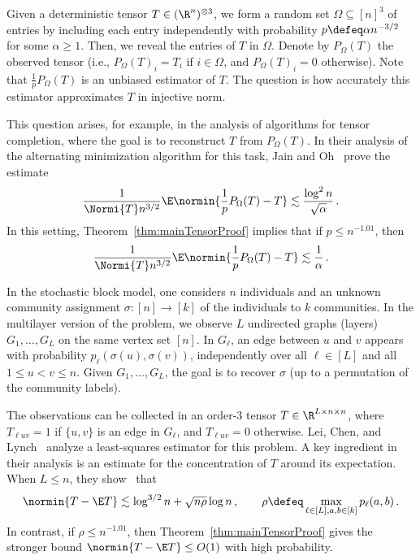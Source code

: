 \documentclass[11pt,a4paper]{article}
\begin{document}
\begin{example}
    Given a
    deterministic tensor $T\in (\R^n)^{\otimes 3}$, we form a random set $\Omega\subseteq [n]^3$
    of entries by including each entry independently
    with probability $p \defeq \alpha n^{-3/2}$ for some $\alpha\ge 1$.
    Then, we
    reveal the entries of $T$ in $\Omega$. Denote by $P_\Omega(T)$ the observed tensor (i.e., $P_\Omega(T)_i = T_i$ if $i\in \Omega$,
    and $P_\Omega(T)_i=0$ otherwise). Note that $\frac 1p P_\Omega(T)$ is an unbiased
    estimator of $T$. The question
    is how accurately this estimator approximates
    $T$ in injective norm. 
    
    This question arises, for example, in the analysis
    of algorithms for tensor completion,
    where the goal is to reconstruct $T$ from $P_\Omega(T)$. In their analysis of the alternating minimization algorithm for this task, Jain and Oh~\cite[Appendix A]{tensorCompletionJain} prove the estimate
    \begin{equation*}
        \frac 1 {\Normi{T} n^{3/2}} \E \normin{\frac 1p P_\Omega(T) - T}\lesssim \frac{\log^2 n} {\sqrt \alpha}\,.
    \end{equation*}
    In this setting,
    Theorem~\ref{thm:mainTensorProof}
    implies that if $p\le n^{-1.01}$, then
    \begin{equation*}
        \frac 1 {\Normi{T}  n^{3/2}} \E \normin{\frac 1p P_\Omega(T) - T}\lesssim \frac{1} {\alpha}\,.
    \end{equation*}
\end{example}

\begin{example}
    In the stochastic block model,
    one considers $n$ individuals and
    an unknown community assignment $\sigma:[n]\to [k]$ of the individuals to $k$ communities. In the multilayer version of the problem, we observe $L$ undirected graphs (layers)
    $G_1, \ldots, G_L$ on the same vertex set $[n]$. In $G_\ell$, an edge between $u$
    and $v$ appears with probability $p_\ell(\sigma(u), \sigma(v))$, independently over all $\ell\in [L]$ and all
    $1\le u<v\le n$. Given $G_1, \ldots, G_L$,
    the goal is to recover $\sigma$ (up to a
    permutation of the community labels).
    
    The observations can be collected in an order-$3$
    tensor $T\in \R^{L\times n\times n}$,
    where $T_{\ell uv} = 1$ if $\{u,v\}$ is an edge in $G_\ell$, and $T_{\ell uv} = 0$ otherwise. 
    Lei, Chen, and Lynch~\cite{multiLayerSBM} analyze a least-squares estimator for this problem.
    A key ingredient in their analysis is an
    estimate for the concentration of $T$ around its expectation. When $L\le n$, they show~\cite[Theorem 2]{multiLayerSBM} that
    \[
        \normin{T - \E T}\lesssim \log^{3/2} n + \sqrt{n\rho } \log n\,,\qquad \rho \defeq \max_{\ell \in [L], a,b\in [k]} p_\ell(a,b)\,.
    \]
    In contrast, if $\rho\le n^{-1.01}$, then
    Theorem~\ref{thm:mainTensorProof} gives the stronger bound $\normin{T - \E T} \le O(1)$ with 
    high probability.
\end{example}
\end{document}
